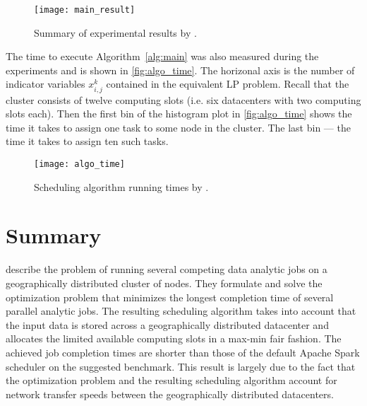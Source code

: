 \begin{figure}
  \centering
  \texttt{[image: main\_result]} \\
  \caption{Summary of experimental results by \citet{Chen2017}.}
  \label{fig:main_result}
\end{figure}

The time to execute Algorithm~\ref{alg:main} was also measured during the experiments and is shown in \autoref{fig:algo_time}. The horizonal axis is the number of indicator variables \(x^k_{i, j}\) contained in the equivalent LP problem. Recall that the cluster consists of twelve computing slots (i.e. six datacenters with two computing slots each). Then the first bin of the histogram plot in \autoref{fig:algo_time} shows the time it takes to assign one task to some node in the cluster. The last bin --- the time it takes to assign ten such tasks.

\begin{figure}
  \centering
  \texttt{[image: algo\_time]} \\
  \caption{Scheduling algorithm running times by \citet{Chen2017}.}
  \label{fig:algo_time}
\end{figure}

\section{Summary}

\citet{Chen2017} describe the problem of running several competing data analytic jobs on a geographically distributed cluster of nodes. They formulate and solve the optimization problem that minimizes the longest completion time of several parallel analytic jobs. The resulting scheduling algorithm takes into account that the input data is stored across a geographically distributed datacenter and allocates the limited available computing slots in a max-min fair fashion. The achieved job completion times are shorter than those of the default Apache Spark scheduler on the suggested benchmark. This result is largely due to the fact that the optimization problem and the resulting scheduling algorithm account for network transfer speeds between the geographically distributed datacenters.
